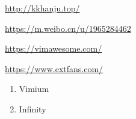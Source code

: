 \documentclass[a4paper]{ctexart}    %
\begin{document}
\begin{tcolorbox}[
         colback=red!5!white,
         colframe=teal,
         title=\textbf{韩剧网}
    ]
    \href{http://kkhanju.top/}{http://kkhanju.top/}
\end{tcolorbox}
\begin{tcolorbox}[
         colback=red!5!white,
         colframe=teal,
         title=\textbf{韩国电影微博}
    ]
    \href{https://m.weibo.cn/u/1965284462}{https://m.weibo.cn/u/1965284462}
\end{tcolorbox}
\begin{tcolorbox}[
         colback=red!5!white,
         colframe=teal,
         title=\textbf{vimawesome}
    ]
    \href{https://vimawesome.com/}{https://vimawesome.com/}
\end{tcolorbox}
\begin{tcolorbox}[
         colback=red!5!white,
         colframe=teal,
         title=\textbf{Extfans谷歌浏览器扩展}
    ]
    \href{https://www.extfans.com/}{https://www.extfans.com/}
    \begin{enumerate}
        \item Vimium
        \item Infinity
    \end{enumerate}

\end{tcolorbox}
\end{document}
